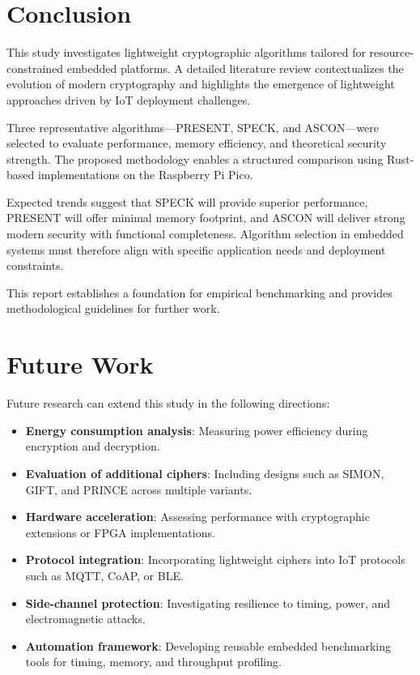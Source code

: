 \documentclass[12pt]{report}
\begin{document}
\section{Conclusion}

This study investigates lightweight cryptographic algorithms tailored for resource-constrained embedded platforms. A detailed literature review contextualizes the evolution of modern cryptography and highlights the emergence of lightweight approaches driven by IoT deployment challenges.

Three representative algorithms—PRESENT, SPECK, and ASCON—were selected to evaluate performance, memory efficiency, and theoretical security strength. The proposed methodology enables a structured comparison using Rust-based implementations on the Raspberry Pi Pico.

Expected trends suggest that SPECK will provide superior performance, PRESENT will offer minimal memory footprint, and ASCON will deliver strong modern security with functional completeness. Algorithm selection in embedded systems must therefore align with specific application needs and deployment constraints.

This report establishes a foundation for empirical benchmarking and provides methodological guidelines for further work.

\section{Future Work}

Future research can extend this study in the following directions:

\begin{itemize}
    \item \textbf{Energy consumption analysis}: Measuring power efficiency during encryption and decryption.
    \item \textbf{Evaluation of additional ciphers}: Including designs such as SIMON, GIFT, and PRINCE across multiple variants.
    \item \textbf{Hardware acceleration}: Assessing performance with cryptographic extensions or FPGA implementations.
    \item \textbf{Protocol integration}: Incorporating lightweight ciphers into IoT protocols such as MQTT, CoAP, or BLE.
    \item \textbf{Side-channel protection}: Investigating resilience to timing, power, and electromagnetic attacks.
    \item \textbf{Automation framework}: Developing reusable embedded benchmarking tools for timing, memory, and throughput profiling.
\end{itemize}
\end{document}
